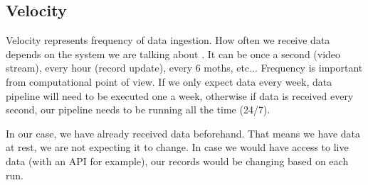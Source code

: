 \subsection{Velocity}\label{Velocity}

Velocity represents frequency of data ingestion. How often we receive data depends on the system we are talking about \parencite{cappa2021big}. It can be once a second (video stream), every hour (record update), every 6 moths, etc... Frequency is important from computational point of view. If we only expect data every week, data pipeline will need to be executed one a week, otherwise if data is received every second, our pipeline needs to be running all the time (24/7).

In our case, we have already received data beforehand. That means we have data at rest, we are not expecting it to change. In case we would have access to live data (with an API for example), our records would be changing based on each run.